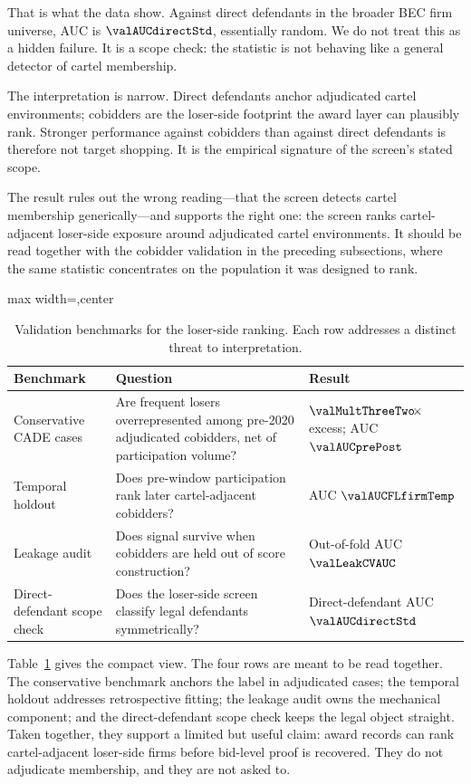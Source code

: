 That is what the data show. Against direct defendants in the
broader BEC firm universe, AUC is $\valAUCdirectStd$,
essentially random. We do not treat this as a hidden failure.
It is a scope check: the statistic is not behaving like a
general detector of cartel membership.

The interpretation is narrow. Direct defendants anchor
adjudicated cartel environments; cobidders are the loser-side
footprint the award layer can plausibly rank. Stronger
performance against cobidders than against direct defendants is
therefore not target shopping. It is the empirical signature of
the screen's stated scope.

The result rules out the wrong reading---that the screen
detects cartel membership generically---and supports the right
one: the screen ranks cartel-adjacent loser-side exposure
around adjudicated cartel environments. It should be read
together with the cobidder validation in the preceding
subsections, where the same statistic concentrates on the
population it was designed to rank.

\begin{table}[htbp]
\centering
\caption{Validation benchmarks for the loser-side ranking. Each
row addresses a distinct threat to interpretation.}
\label{tab:validation_benchmarks_v18}
\footnotesize
\begin{adjustbox}{max width=\textwidth,center}
\begin{tabular}{p{3.3cm}p{6.0cm}p{3.8cm}}
\toprule
Benchmark & Question & Result \\
\midrule
Conservative CADE cases & Are frequent losers overrepresented among pre-2020 adjudicated cobidders, net of participation volume? & $\valMultThreeTwo\!\times$ excess; AUC $\valAUCprePost$ \\
Temporal holdout & Does pre-window participation rank later cartel-adjacent cobidders? & AUC $\valAUCFLfirmTemp$ \\
Leakage audit & Does signal survive when cobidders are held out of score construction? & Out-of-fold AUC $\valLeakCVAUC$ \\
Direct-defendant scope check & Does the loser-side screen classify legal defendants symmetrically? & Direct-defendant AUC $\valAUCdirectStd$ \\
\bottomrule
\end{tabular}
\end{adjustbox}
\end{table}

Table~\ref{tab:validation_benchmarks_v18} gives the compact
view. The four rows are meant to be read together. The
conservative benchmark anchors the label in adjudicated cases;
the temporal holdout addresses retrospective fitting; the
leakage audit owns the mechanical component; and the
direct-defendant scope check keeps the legal object straight. Taken
together, they support a limited but useful claim: award records
can rank cartel-adjacent loser-side firms before bid-level proof
is recovered. They do not adjudicate membership, and they are not
asked to.
